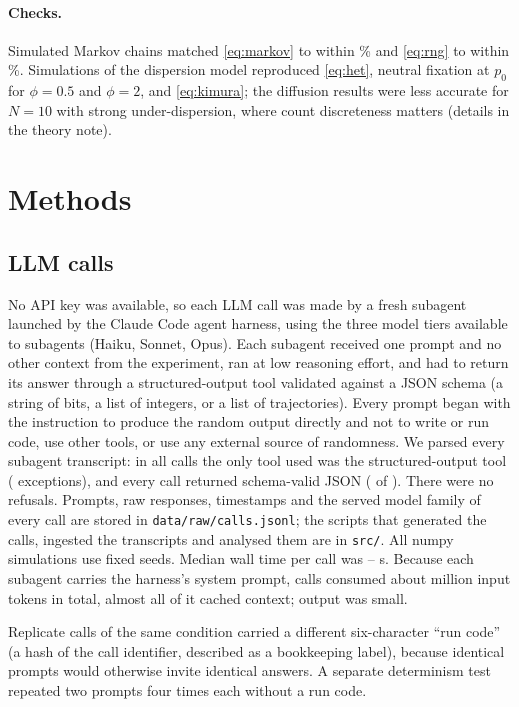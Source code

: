 \documentclass[11pt,a4paper]{article}
\begin{document}
\paragraph{Checks.}
Simulated Markov chains matched \eqref{eq:markov} to within \thMaxVarErr\% and \eqref{eq:rng} to within \thMaxNeErr\%.
Simulations of the dispersion model reproduced \eqref{eq:het}, neutral fixation at $p_0$ for $\phi=0.5$ and $\phi=2$, and \eqref{eq:kimura}; the diffusion results were less accurate for $N=10$ with strong under-dispersion, where count discreteness matters (details in the theory note).

\section{Methods}

\subsection{LLM calls}
No API key was available, so each LLM call was made by a fresh subagent launched by the Claude Code agent harness, using the three model tiers available to subagents (Haiku, Sonnet, Opus).
Each subagent received one prompt and no other context from the experiment, ran at low reasoning effort, and had to return its answer through a structured-output tool validated against a JSON schema (a string of bits, a list of integers, or a list of trajectories).
Every prompt began with the instruction to produce the random output directly and not to write or run code, use other tools, or use any external source of randomness.
We parsed every subagent transcript: in all \nCalls{} calls the only tool used was the structured-output tool (\nOtherTools{} exceptions), and every call returned schema-valid JSON (\nValid{} of \nCalls).
There were no refusals.
Prompts, raw responses, timestamps and the served model family of every call are stored in \texttt{data/raw/calls.jsonl}; the scripts that generated the calls, ingested the transcripts and analysed them are in \texttt{src/}.
All numpy simulations use fixed seeds.
Median wall time per call was \secsSonnet--\secsHaiku{} s.
Because each subagent carries the harness's system prompt, calls consumed about \ctxTokensM{} million input tokens in total, almost all of it cached context; output was small.

Replicate calls of the same condition carried a different six-character ``run code'' (a hash of the call identifier, described as a bookkeeping label), because identical prompts would otherwise invite identical answers.
A separate determinism test repeated two prompts four times each without a run code.
\end{document}
